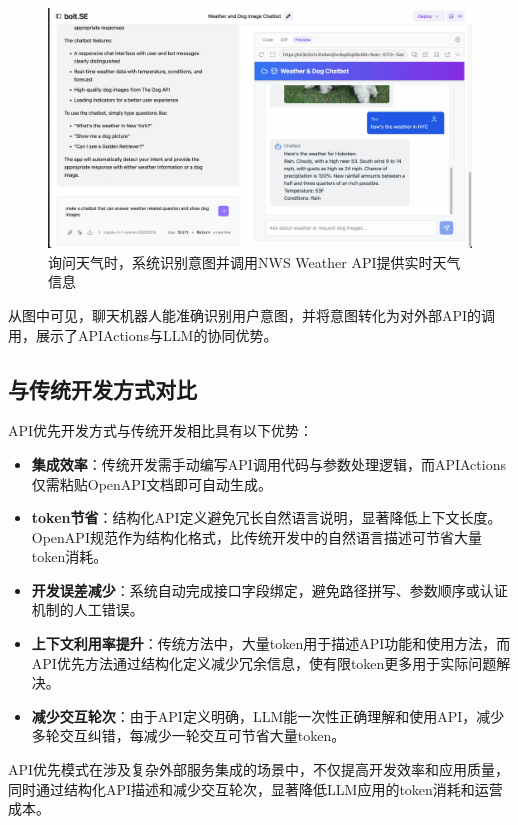 \begin{figure}[htbp]
  \centering
  \includegraphics[width=\textwidth]{figures/screenshots/api-actions/demo_weather_preview.png}
  \caption{询问天气时，系统识别意图并调用NWS Weather API提供实时天气信息}
  \label{fig:demo_weather}
\end{figure}

从图中可见，聊天机器人能准确识别用户意图，并将意图转化为对外部API的调用，展示了APIActions与LLM的协同优势。

\subsection{与传统开发方式对比}

API优先开发方式与传统开发相比具有以下优势：

\begin{itemize}
  \item \textbf{集成效率}：传统开发需手动编写API调用代码与参数处理逻辑，而APIActions仅需粘贴OpenAPI文档即可自动生成。
  
  \item \textbf{token节省}：结构化API定义避免冗长自然语言说明，显著降低上下文长度。OpenAPI规范作为结构化格式，比传统开发中的自然语言描述可节省大量token消耗。 
  
  \item \textbf{开发误差减少}：系统自动完成接口字段绑定，避免路径拼写、参数顺序或认证机制的人工错误。
  
  \item \textbf{上下文利用率提升}：传统方法中，大量token用于描述API功能和使用方法，而API优先方法通过结构化定义减少冗余信息，使有限token更多用于实际问题解决。
  
  \item \textbf{减少交互轮次}：由于API定义明确，LLM能一次性正确理解和使用API，减少多轮交互纠错，每减少一轮交互可节省大量token。
\end{itemize}

API优先模式在涉及复杂外部服务集成的场景中，不仅提高开发效率和应用质量，同时通过结构化API描述和减少交互轮次，显著降低LLM应用的token消耗和运营成本。
